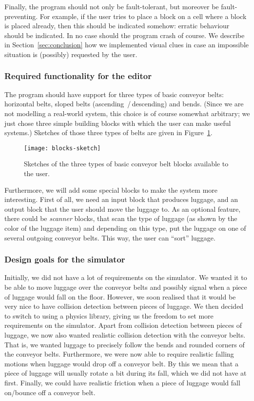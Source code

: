 Finally, the program should not only be fault-tolerant, but moreover be fault-preventing. For example, if the user tries to place a block on a cell where a block is placed already, then this should be indicated somehow: erratic behaviour should be indicated. In no case should the program crash of course. We describe in Section~\ref{sec:conclusion} how we implemented visual clues in case an impossible situation is (possibly) requested by the user.

\subsubsection{Required functionality for the editor}
\label{subsubsec:req-functionality-simulator}
The program should have support for three types of basic conveyor belts: horizontal belts, sloped belts (ascending \,/\,descending) and bends. (Since we are not modelling a real-world system, this choice is of course somewhat arbitrary; we just chose three simple building blocks with which the user can make useful systems.) Sketches of those three types of belts are given in Figure~\ref{fig:blocks-sketch}.
\begin{figure}
  \begin{center}
    \texttt{[image: blocks-sketch]}
    \caption{Sketches of the three types of basic conveyor belt blocks available to the user.}
    \label{fig:blocks-sketch}
  \end{center}
\end{figure}

Furthermore, we will add some special blocks to make the system more interesting. First of all, we need an input block that produces luggage, and an output block that the user should move the luggage to. As an optional feature, there could be \emph{scanner} blocks, that scan the type of luggage (as shown by the color of the luggage item) and depending on this type, put the luggage on one of several outgoing conveyor belts. This way, the user can ``sort'' luggage.

\subsubsection{Design goals for the simulator}
\label{subsubsec:design-goals-simulator}
Initially, we did not have a lot of requirements on the simulator. We wanted it to be able to move luggage over the conveyor belts and possibly signal when a piece of luggage would fall on the floor. However, we soon realised that it would be very nice to have collision detection between pieces of luggage. We then decided to switch to using a physics library, giving us the freedom to set more requirements on the simulator. Apart from collision detection between pieces of luggage, we now also wanted realistic collision detection with the conveyor belts. That is, we wanted luggage to precisely follow the bends and rounded corners of the conveyor belts. Furthermore, we were now able to require realistic falling motions when luggage would drop off a conveyor belt. By this we mean that a piece of luggage will usually rotate a bit during its fall, which we did not have at first. Finally, we could have realistic friction when a piece of luggage would fall on/bounce off a conveyor belt.

